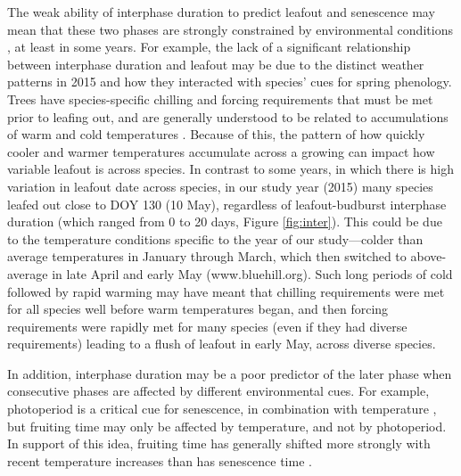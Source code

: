 \documentclass{article}
\begin{document}
\par The weak ability of interphase duration to predict leafout and senescence may mean that these two phases are strongly constrained by environmental conditions \citep{fenner1998}, at least in some years. For example, the lack of a significant relationship between interphase duration and leafout may be due to the distinct weather patterns in 2015 and how they interacted with species' cues for spring phenology.  Trees have species-specific chilling and forcing requirements that must be met prior to leafing out, and are generally understood to be related to accumulations of warm and cold temperatures \citep[e.g.][]{schwartz2010,chuine2010,clark2014b,flynnrev}. Because of this, the pattern of how quickly cooler and warmer temperatures accumulate across a growing can impact how variable leafout is across species. In contrast to some years, in which there is high variation in leafout date across species, in our study year (2015) many species leafed out close to DOY 130 (10 May), regardless of leafout-budburst interphase duration (which ranged from 0 to 20 days, Figure \ref{fig:inter}).  This could be due to the temperature conditions specific to the year of our study---colder than average temperatures in January through March, which then switched to above-average in late April and early May (www.bluehill.org). Such long periods of cold followed by rapid warming may have meant that chilling requirements were met for all species well before warm temperatures began, and then forcing requirements were rapidly met for many species (even if they had diverse requirements) leading to a flush of leafout in early May, across diverse species. 

\par In addition, interphase duration may be a poor predictor of the later phase when consecutive phases are affected by different environmental cues. For example, photoperiod is a critical cue for senescence, in combination with temperature \citep{delpierre2009}, but fruiting time may only be affected by temperature, and not by photoperiod. In support of this idea, fruiting time has generally shifted more strongly with recent temperature increases than has senescence time \citep{menzel2006}.
\end{document}
